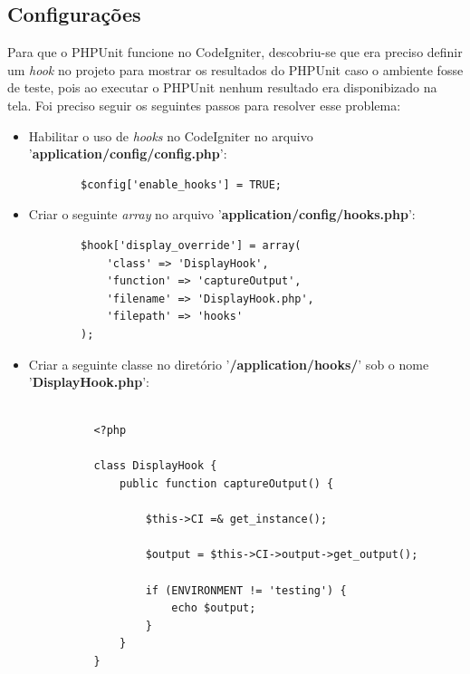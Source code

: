       \subsection{Configurações}
	  
	  Para que o PHPUnit funcione no CodeIgniter, descobriu-se que era preciso definir um \textit{hook}\footnotemark
	  no projeto para mostrar os resultados do PHPUnit caso o ambiente fosse de teste, pois ao executar o PHPUnit nenhum
	  resultado era disponibizado na tela. Foi preciso seguir os seguintes passos para resolver esse problema:
	  
	  \begin{itemize}
	  
	   \item Habilitar o uso de \textit{hooks} no CodeIgniter no arquivo '\textbf{application/config/config.php}':
	      
	      \begin{verbatim}
		$config['enable_hooks'] = TRUE;
	      \end{verbatim}
	      
	   \vfill
	   \pagebreak
	   \item Criar o seguinte \textit{array} no arquivo '\textbf{application/config/hooks.php}':
	  
	      \begin{lstlisting}
		$hook['display_override'] = array(
		    'class' => 'DisplayHook',
		    'function' => 'captureOutput',
		    'filename' => 'DisplayHook.php',
		    'filepath' => 'hooks'
		);
	      \end{lstlisting}
	   
	   \item Criar a seguinte classe no diretório '\textbf{/application/hooks/}' sob o nome '\textbf{DisplayHook.php}':
	  
	  \begin{lstlisting}
	  
	      <?php
	      
	      class DisplayHook {
	          public function captureOutput() {

	              $this->CI =& get_instance();
			  
	              $output = $this->CI->output->get_output();

	              if (ENVIRONMENT != 'testing') {
	                  echo $output;
	              }
	          }
	      }
	  \end{lstlisting}
	  
	  \end{itemize}
	  

